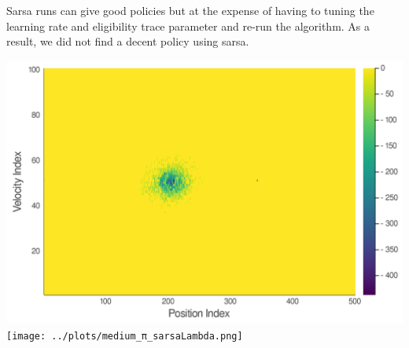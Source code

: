 \documentclass[10pt,letterpaper]{article}
\newenvironment{Figure}
{\par\medskip\noindent\minipage{\linewidth}}
{\endminipage\par\medskip}
\begin{document}
\begin{multicols*}{2}
\begin{Figure}
		\label{fig:medium_πm_GSVI}
	\end{Figure}
	Sarsa runs can give good policies but at the expense of having to tuning the learning rate and eligibility trace parameter and re-run the algorithm. As a result, we did not find a decent policy using sarsa. 
	\begin{Figure}
		\centering
		\includegraphics[width=\linewidth]{../plots/medium_U_sarsaLambda.png}
		\texttt{[image: ../plots/medium\_π\_sarsaLambda.png]}
		\label{fig:medium_U_sl}
	\end{Figure}	

\end{multicols*}
\end{document}
